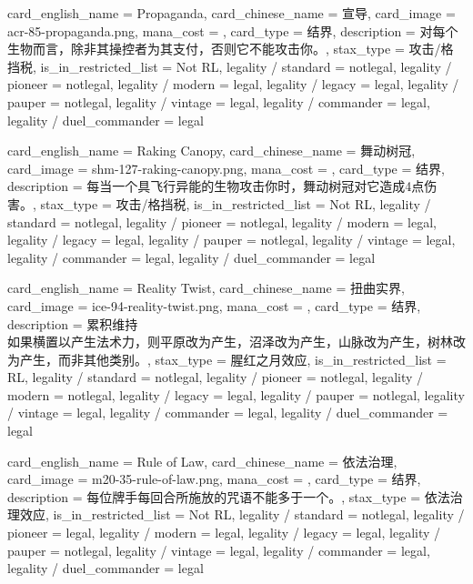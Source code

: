 \documentclass[lang = cn, color = black, 10pt]{AllThatStax}
\begin{document}
\card
{
	card_english_name = {Propaganda},
	card_chinese_name = {宣导},
	card_image = acr-85-propaganda.png,
	mana_cost = ,
	card_type = 结界,
	description = {对每个生物而言，除非其操控者为其支付，否则它不能攻击你。},
	stax_type = 攻击/格挡税,
	is_in_restricted_list = Not RL,
	legality / standard = notlegal,
	legality / pioneer = notlegal,
	legality / modern = legal,
	legality / legacy = legal,
	legality / pauper = notlegal,
	legality / vintage = legal,
	legality / commander = legal,
	legality / duel_commander = legal
}

\card
{
	card_english_name = {Raking Canopy},
	card_chinese_name = {舞动树冠},
	card_image = shm-127-raking-canopy.png,
	mana_cost = ,
	card_type = 结界,
	description = {每当一个具飞行异能的生物攻击你时，舞动树冠对它造成4点伤害。},
	stax_type = 攻击/格挡税,
	is_in_restricted_list = Not RL,
	legality / standard = notlegal,
	legality / pioneer = notlegal,
	legality / modern = legal,
	legality / legacy = legal,
	legality / pauper = notlegal,
	legality / vintage = legal,
	legality / commander = legal,
	legality / duel_commander = legal
}

\card
{
	card_english_name = {Reality Twist},
	card_chinese_name = {扭曲实界},
	card_image = ice-94-reality-twist.png,
	mana_cost = ,
	card_type = 结界,
	description = {累积维持\\
如果横置以产生法术力，则平原改为产生，沼泽改为产生，山脉改为产生，树林改为产生，而非其他类别。},
	stax_type = 腥红之月效应,
	is_in_restricted_list = RL,
	legality / standard = notlegal,
	legality / pioneer = notlegal,
	legality / modern = notlegal,
	legality / legacy = legal,
	legality / pauper = notlegal,
	legality / vintage = legal,
	legality / commander = legal,
	legality / duel_commander = legal
}

\card
{
	card_english_name = {Rule of Law},
	card_chinese_name = {依法治理},
	card_image = m20-35-rule-of-law.png,
	mana_cost = ,
	card_type = 结界,
	description = {每位牌手每回合所施放的咒语不能多于一个。},
	stax_type = 依法治理效应,
	is_in_restricted_list = Not RL,
	legality / standard = notlegal,
	legality / pioneer = legal,
	legality / modern = legal,
	legality / legacy = legal,
	legality / pauper = notlegal,
	legality / vintage = legal,
	legality / commander = legal,
	legality / duel_commander = legal
}
\end{document}
